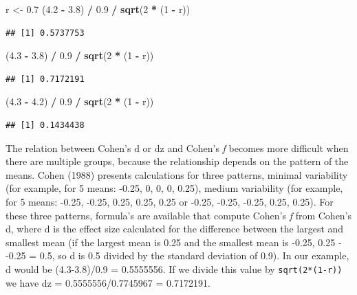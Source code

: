 \documentclass[]{book}
\newenvironment{Shaded}{\begin{snugshade}}{\end{snugshade}}
\newcommand{\DecValTok}[1]{\textcolor[rgb]{0.00,0.00,0.81}{#1}}
\newcommand{\FloatTok}[1]{\textcolor[rgb]{0.00,0.00,0.81}{#1}}
\newcommand{\KeywordTok}[1]{\textcolor[rgb]{0.13,0.29,0.53}{\textbf{#1}}}
\newcommand{\NormalTok}[1]{#1}
\newcommand{\OperatorTok}[1]{\textcolor[rgb]{0.81,0.36,0.00}{\textbf{#1}}}
\newcommand{\StringTok}[1]{\textcolor[rgb]{0.31,0.60,0.02}{#1}}
\begin{document}
\begin{Shaded}
\begin{Highlighting}[]
\NormalTok{  r <-}\StringTok{ }\FloatTok{0.7}
\NormalTok{  (}\FloatTok{4.2} \OperatorTok{-}\StringTok{ }\FloatTok{3.8}\NormalTok{) }\OperatorTok{/}\StringTok{ }\FloatTok{0.9} \OperatorTok{/}\StringTok{ }\KeywordTok{sqrt}\NormalTok{(}\DecValTok{2} \OperatorTok{*}\StringTok{ }\NormalTok{(}\DecValTok{1} \OperatorTok{-}\StringTok{ }\NormalTok{r))}
\end{Highlighting}
\end{Shaded}

\begin{verbatim}
## [1] 0.5737753
\end{verbatim}

\begin{Shaded}
\begin{Highlighting}[]
\NormalTok{  (}\FloatTok{4.3} \OperatorTok{-}\StringTok{ }\FloatTok{3.8}\NormalTok{) }\OperatorTok{/}\StringTok{ }\FloatTok{0.9} \OperatorTok{/}\StringTok{ }\KeywordTok{sqrt}\NormalTok{(}\DecValTok{2} \OperatorTok{*}\StringTok{ }\NormalTok{(}\DecValTok{1} \OperatorTok{-}\StringTok{ }\NormalTok{r))}
\end{Highlighting}
\end{Shaded}

\begin{verbatim}
## [1] 0.7172191
\end{verbatim}

\begin{Shaded}
\begin{Highlighting}[]
\NormalTok{  (}\FloatTok{4.3} \OperatorTok{-}\StringTok{ }\FloatTok{4.2}\NormalTok{) }\OperatorTok{/}\StringTok{ }\FloatTok{0.9} \OperatorTok{/}\StringTok{ }\KeywordTok{sqrt}\NormalTok{(}\DecValTok{2} \OperatorTok{*}\StringTok{ }\NormalTok{(}\DecValTok{1} \OperatorTok{-}\StringTok{ }\NormalTok{r))}
\end{Highlighting}
\end{Shaded}

\begin{verbatim}
## [1] 0.1434438
\end{verbatim}

The relation between Cohen's d or dz and Cohen's \emph{f} becomes more difficult when there are multiple groups, because the relationship depends on the pattern of the means. Cohen (1988) presents calculations for three patterns, minimal variability (for example, for 5 means: -0.25, 0, 0, 0, 0.25), medium variability (for example, for 5 means: -0.25, -0.25, 0.25, 0.25, 0.25 or -0.25, -0.25, -0.25, 0.25, 0.25). For these three patterns, formula's are available that compute Cohen's \emph{f} from Cohen's d, where d is the effect size calculated for the difference between the largest and smallest mean (if the largest mean is 0.25 and the smallest mean is -0.25, 0.25 - -0.25 = 0.5, so d is 0.5 divided by the standard deviation of 0.9). In our example, d would be (4.3-3.8)/0.9 = 0.5555556. If we divide this value by \texttt{sqrt(2*(1-r))} we have dz = 0.5555556/0.7745967 = 0.7172191.
\end{document}

